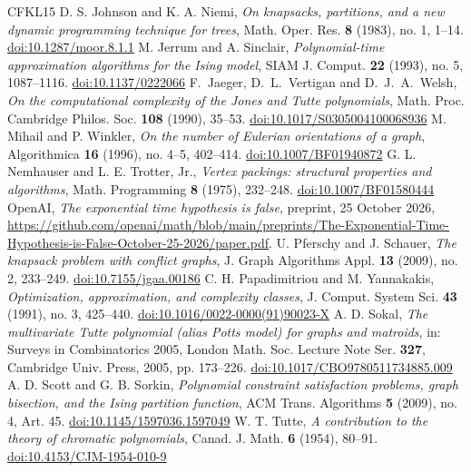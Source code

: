 \begin{thebibliography}{CFKL15}
 D. S. Johnson and K. A. Niemi, \emph{On knapsacks, partitions, and a new dynamic programming technique for trees}, Math. Oper. Res. \textbf{8} (1983), no. 1, 1--14. \href{https://doi.org/10.1287/moor.8.1.1}{doi:10.1287/moor.8.1.1}
 M. Jerrum and A. Sinclair, \emph{Polynomial-time approximation algorithms for the Ising model}, SIAM J. Comput. \textbf{22} (1993), no. 5, 1087--1116. \href{https://doi.org/10.1137/0222066}{doi:10.1137/0222066}
 F.~Jaeger, D.~L.~Vertigan and D.~J.~A.~Welsh, \emph{On the computational complexity of the Jones and Tutte polynomials}, Math. Proc. Cambridge Philos. Soc. \textbf{108} (1990), 35--53. \href{https://doi.org/10.1017/S0305004100068936}{doi:10.1017/S0305004100068936}
 M. Mihail and P. Winkler, \emph{On the number of Eulerian orientations of a graph}, Algorithmica \textbf{16} (1996), no. 4--5, 402--414. \href{https://doi.org/10.1007/BF01940872}{doi:10.1007/BF01940872}
 G. L. Nemhauser and L. E. Trotter, Jr., \emph{Vertex packings: structural properties and algorithms}, Math. Programming \textbf{8} (1975), 232--248. \href{https://doi.org/10.1007/BF01580444}{doi:10.1007/BF01580444}
 OpenAI, \emph{The exponential time hypothesis is false}, preprint, 25 October 2026, \url{https://github.com/openai/math/blob/main/preprints/The-Exponential-Time-Hypothesis-is-False-October-25-2026/paper.pdf}.
 U. Pferschy and J. Schauer, \emph{The knapsack problem with conflict graphs}, J. Graph Algorithms Appl. \textbf{13} (2009), no. 2, 233--249. \href{https://doi.org/10.7155/jgaa.00186}{doi:10.7155/jgaa.00186}
 C. H. Papadimitriou and M. Yannakakis, \emph{Optimization, approximation, and complexity classes}, J. Comput. System Sci. \textbf{43} (1991), no. 3, 425--440. \href{https://doi.org/10.1016/0022-0000(91)90023-X}{doi:10.1016/0022-0000(91)90023-X}
 A. D. Sokal, \emph{The multivariate Tutte polynomial (alias Potts model) for graphs and matroids}, in: Surveys in Combinatorics 2005, London Math. Soc. Lecture Note Ser. \textbf{327}, Cambridge Univ. Press, 2005, pp. 173--226. \href{https://doi.org/10.1017/CBO9780511734885.009}{doi:10.1017/CBO9780511734885.009}
 A. D. Scott and G. B. Sorkin, \emph{Polynomial constraint satisfaction problems, graph bisection, and the Ising partition function}, ACM Trans. Algorithms \textbf{5} (2009), no. 4, Art. 45. \href{https://doi.org/10.1145/1597036.1597049}{doi:10.1145/1597036.1597049}
 W. T. Tutte, \emph{A contribution to the theory of chromatic polynomials}, Canad. J. Math. \textbf{6} (1954), 80--91. \href{https://doi.org/10.4153/CJM-1954-010-9}{doi:10.4153/CJM-1954-010-9}

\end{thebibliography}
